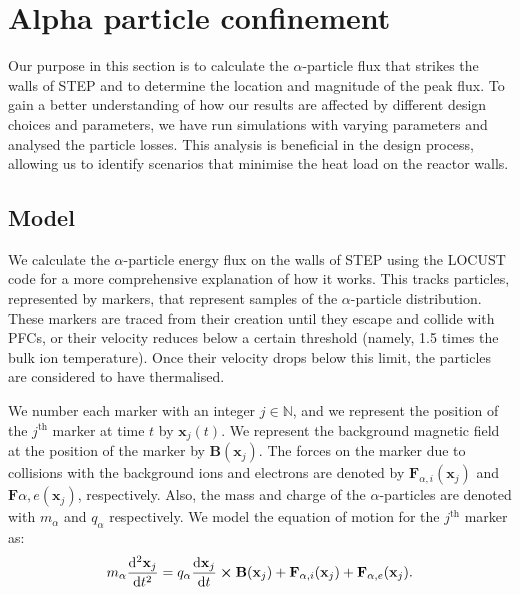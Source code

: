 \documentclass[10pt, a4paper, twoside]{article}
\begin{document}
\section{Alpha particle confinement}
\label{sec:locust_work}

Our purpose in this section is to calculate the $\alpha$-particle flux that strikes the walls of STEP and to determine the location and magnitude of the peak flux. To gain a better understanding of how our results are affected by different design choices and parameters, we have run simulations with varying parameters and analysed the particle losses. This analysis is beneficial in the design process, allowing us to identify scenarios that minimise the heat load on the reactor walls.

\subsection{Model}

We calculate the $\alpha$-particle energy flux on the walls of STEP using the LOCUST code \cite{akers2018, ward2021} for a more comprehensive explanation of how it works. This tracks particles, represented by markers, that represent samples of the $\alpha$-particle distribution. These markers are traced from their creation until they escape and collide with PFCs, or their velocity reduces below a certain threshold (namely, 1.5 times the bulk ion temperature). Once their velocity drops below this limit, the particles are considered to have thermalised.

We number each marker with an integer $j \in \mathbb{N}$, and we represent the position of the $j^{\text{th}}$ marker at time $t$ by $\mathbf{x}_j(t)$.
We represent the background magnetic field at the position of the marker by $\textbf{B}(\mathbf{x}_j)$.
The forces on the marker due to collisions with the background ions and electrons are denoted by $\textbf{F}_{\alpha,i}(\mathbf{x}_j)$ and $\textbf{F}{\alpha,e}(\mathbf{x}_j)$, respectively.
Also, the mass and charge of the $\alpha$-particles are denoted with $m_\alpha$ and $q_\alpha$ respectively.
We model the equation of motion for the $j^{\text{th}}$ marker as:
\begin{equation}
m_\alpha\dv[2]{\mathbf{x}_j}{t} = q_\alpha\dv{\mathbf{x}_j}{t}\cross\textbf{B}(\mathbf{x}_j) + \textbf{F}_{\alpha,i}(\mathbf{x}_j) + \textbf{F}_{\alpha,e}(\mathbf{x}_j).
\end{equation}
\end{document}
